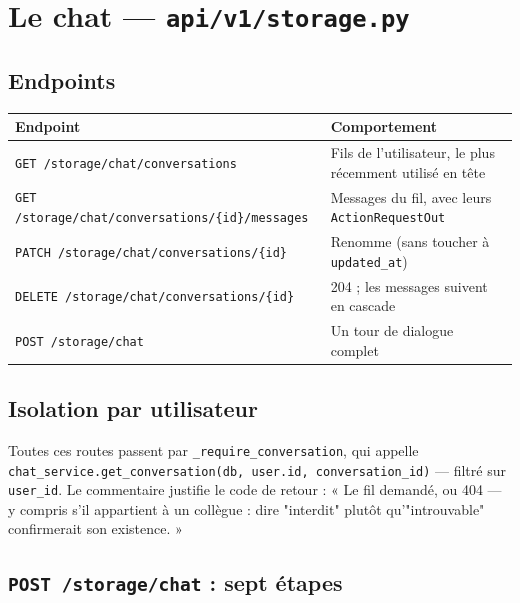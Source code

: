 \documentclass[11pt,a4paper]{report}
\newcommand{\file}[1]{\texttt{\small #1}}
\newcommand{\fn}[1]{\texttt{\small\textcolor{oasisviolet}{#1}}}
\newcommand{\cls}[1]{\texttt{\small\textcolor{oasisblue}{#1}}}
\newcommand{\route}[1]{\texttt{\small\textcolor{oasisgreen}{#1}}}
\begin{document}
\section{Le chat --- \file{api/v1/storage.py}}

\subsection*{Endpoints}

\begin{longtable}{@{}p{6.0cm}p{8.8cm}@{}}
\toprule
\textbf{Endpoint} & \textbf{Comportement}\\
\midrule
\endhead
\route{GET /storage/chat/conversations} & Fils de l'utilisateur, le plus récemment utilisé en tête\\
\route{GET /storage/chat/conversations/\{id\}/messages} & Messages du fil, avec leurs \cls{ActionRequestOut}\\
\route{PATCH /storage/chat/conversations/\{id\}} & Renomme (sans toucher à \texttt{updated\_at})\\
\route{DELETE /storage/chat/conversations/\{id\}} & 204 ; les messages suivent en cascade\\
\route{POST /storage/chat} & Un tour de dialogue complet\\
\bottomrule
\end{longtable}

\subsection*{Isolation par utilisateur}
Toutes ces routes passent par \fn{\_require\_conversation}, qui appelle
\fn{chat\_service.get\_conversation(db, user.id, conversation\_id)} --- filtré
sur \texttt{user\_id}. Le commentaire justifie le code de retour : « Le fil
demandé, ou 404 --- y compris s'il appartient à un collègue : dire "interdit"
plutôt qu'"introuvable" confirmerait son existence. »

\subsection*{\route{POST /storage/chat} : sept étapes}
\end{document}
